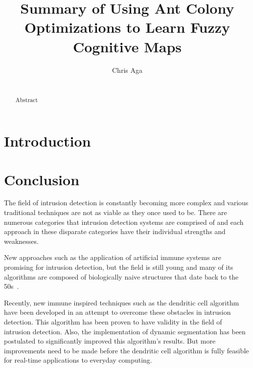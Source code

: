 \documentclass{umm-senior-sem}
\begin{document}
\title{Summary of Using Ant Colony Optimizations to Learn Fuzzy Cognitive Maps}
\author{
\alignauthor
Chris Aga \\
 \\
}

\maketitle

\begin{abstract}
Abstract
\end{abstract}


\section{Introduction}


\section{Conclusion}
\label{sec:Conclusion}
The field of intrusion detection is constantly becoming more complex and various traditional techniques are not as viable as they once used to be. There are numerous categories that intrusion detection systems are comprised of and each approach in these disparate categories have their individual strengths and weaknesses. 

New approaches such as the application of artificial immune systems are promising for intrusion detection, but the field is still young and many of its algorithms are composed of biologically naive structures that date back to the 50s~\cite{greensmith_thesis:2007}.

Recently, new immune inspired techniques such as the dendritic cell algorithm have been developed in an attempt to overcome these obstacles in intrusion detection. This algorithm has been proven to have validity in the field of intrusion detection. Also, the implementation of dynamic segmentation has been postulated to significantly improved this algorithm's results. But more improvements need to be made before the dendritic cell algorithm is fully feasible for real-time applications to everyday computing.

\nocite{*}



\end{document}
